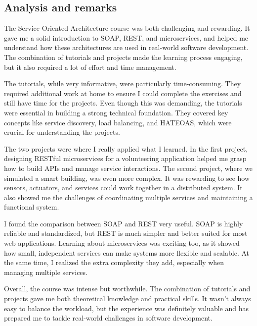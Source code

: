 \subsection{Analysis and remarks}

The Service-Oriented Architecture course was both challenging and rewarding. It gave me a solid introduction to SOAP, REST, and microservices, and helped me understand how these architectures are used in real-world software development. The combination of tutorials and projects made the learning process engaging, but it also required a lot of effort and time management.

The tutorials, while very informative, were particularly time-consuming. They required additional work at home to ensure I could complete the exercises and still have time for the projects. Even though this was demanding, the tutorials were essential in building a strong technical foundation. They covered key concepts like service discovery, load balancing, and HATEOAS, which were crucial for understanding the projects.

The two projects were where I really applied what I learned. In the first project, designing RESTful microservices for a volunteering application helped me grasp how to build APIs and manage service interactions. The second project, where we simulated a smart building, was even more complex. It was rewarding to see how sensors, actuators, and services could work together in a distributed system. It also showed me the challenges of coordinating multiple services and maintaining a functional system.

I found the comparison between SOAP and REST very useful. SOAP is highly reliable and standardized, but REST is much simpler and better suited for most web applications. Learning about microservices was exciting too, as it showed how small, independent services can make systems more flexible and scalable. At the same time, I realized the extra complexity they add, especially when managing multiple services.

Overall, the course was intense but worthwhile. The combination of tutorials and projects gave me both theoretical knowledge and practical skills. It wasn’t always easy to balance the workload, but the experience was definitely valuable and has prepared me to tackle real-world challenges in software development.